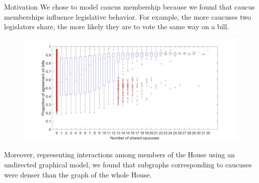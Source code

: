 \documentclass[final]{beamer}
\newlength{\onecolwid}
\begin{document}
\begin{frame}[t]
\begin{columns}[t]
\begin{column}{\onecolwid}
\begin{block}{Motivation}
We chose to model caucus membership because we found that caucus memberships influence legislative behavior. For example, the more caucuses two legislators share, the more likely they are to vote the same way on a bill. 

\begin{figure}[h]
  \centering
        \includegraphics[width=\textwidth]{Caucus_vs_Votes.jpg}
\end{figure}


Moreover, representing interactions among members of the House using an undirected graphical model, we found that subgraphs corresponding to caucuses were denser than the graph of the whole House. 



\end{block}
\end{column}
\end{columns}
\end{frame}
\end{document}
